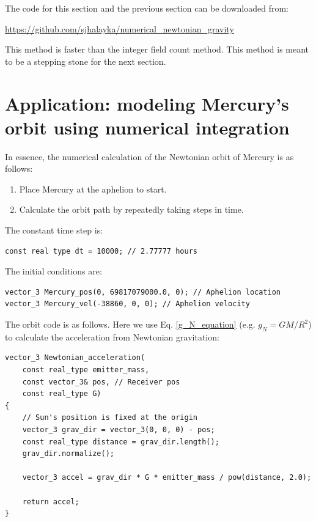 \documentclass[12pt]{article}
\begin{document}
The code for this section and the previous section can be downloaded from:

\url{https://github.com/sjhalayka/numerical_newtonian_gravity}

This method is faster than the integer field count method.
This method is meant to be a stepping stone for the next section.





\section{Application: modeling Mercury's orbit using numerical integration}

In essence, the numerical calculation of the Newtonian orbit of Mercury is as follows:
\begin{enumerate}
\item Place Mercury at the aphelion to start.
\item Calculate the orbit path by repeatedly taking steps in time.
\end{enumerate}

The constant time step \cite{fiedler1} is:
\begin{lstlisting}
const real type dt = 10000; // 2.77777 hours
\end{lstlisting}

The initial conditions are:
\begin{lstlisting}
vector_3 Mercury_pos(0, 69817079000.0, 0); // Aphelion location
vector_3 Mercury_vel(-38860, 0, 0); // Aphelion velocity
\end{lstlisting}

The orbit code is as follows. 
Here we use Eq. \ref{g_N_equation} (e.g. $g_N = {G M}/{R^2}$) to calculate the acceleration from Newtonian gravitation:
\begin{lstlisting}
vector_3 Newtonian_acceleration(
	const real_type emitter_mass,
	const vector_3& pos, // Receiver pos
	const real_type G)
{
	// Sun's position is fixed at the origin
	vector_3 grav_dir = vector_3(0, 0, 0) - pos;
	const real_type distance = grav_dir.length();
	grav_dir.normalize();

	vector_3 accel = grav_dir * G * emitter_mass / pow(distance, 2.0);

	return accel;
}
\end{lstlisting}
\end{document}
